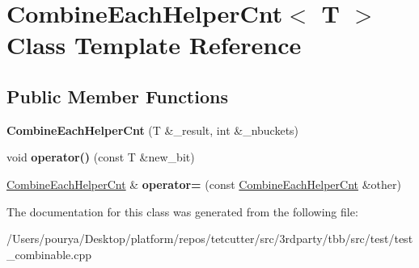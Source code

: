 \hypertarget{classCombineEachHelperCnt}{}\section{Combine\+Each\+Helper\+Cnt$<$ T $>$ Class Template Reference}
\label{classCombineEachHelperCnt}
\subsection*{Public Member Functions}
\begin{DoxyCompactItemize}
\item 
\hypertarget{classCombineEachHelperCnt_a278d4defb82c1118252840e58f090ea8}{}{\bfseries Combine\+Each\+Helper\+Cnt} (T \&\+\_\+result, int \&\+\_\+nbuckets)\label{classCombineEachHelperCnt_a278d4defb82c1118252840e58f090ea8}

\item 
\hypertarget{classCombineEachHelperCnt_a8ee8c89ca1c1cb8eafe1b58cdfbfae99}{}void {\bfseries operator()} (const T \&new\+\_\+bit)\label{classCombineEachHelperCnt_a8ee8c89ca1c1cb8eafe1b58cdfbfae99}

\item 
\hypertarget{classCombineEachHelperCnt_a87c346ff8298e2f008c798f73001daa9}{}\hyperlink{classCombineEachHelperCnt}{Combine\+Each\+Helper\+Cnt} \& {\bfseries operator=} (const \hyperlink{classCombineEachHelperCnt}{Combine\+Each\+Helper\+Cnt} \&other)\label{classCombineEachHelperCnt_a87c346ff8298e2f008c798f73001daa9}

\end{DoxyCompactItemize}


The documentation for this class was generated from the following file\+:\begin{DoxyCompactItemize}
\item 
/\+Users/pourya/\+Desktop/platform/repos/tetcutter/src/3rdparty/tbb/src/test/test\+\_\+combinable.\+cpp\end{DoxyCompactItemize}
